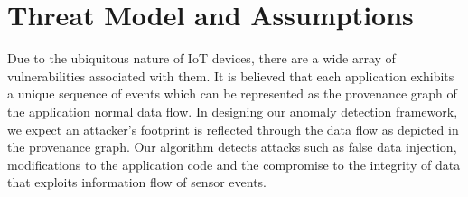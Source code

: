 %
%







\section{Threat Model and Assumptions}
Due to the ubiquitous nature of IoT devices, there are a wide array of vulnerabilities associated with them. It is believed that each application exhibits a unique sequence of events which can be represented as the provenance graph of the application normal data flow. In designing our anomaly detection framework, we expect an attacker's footprint is reflected through the data flow as depicted in the provenance graph. Our algorithm detects attacks such as false data injection, modifications to the application code and the compromise to the integrity of data that exploits information flow of sensor events. 





%

